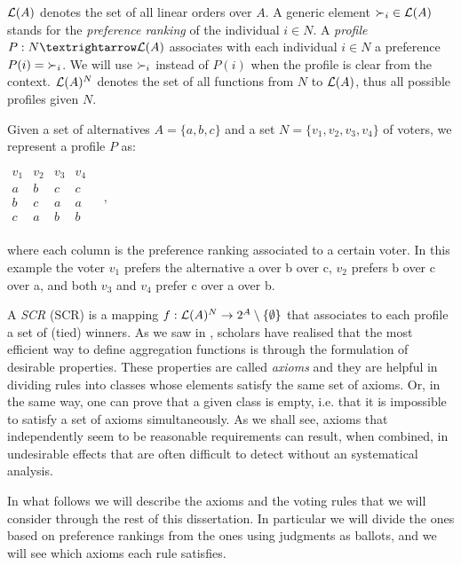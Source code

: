 $\mathcal{L}(A)$ denotes the set of all linear orders over $A$. A generic element $\mathop{\prefi} \in \linors$ stands for the \textit{preference ranking} of the individual $i\in N$.
A \emph{profile} $\prof: N → \linors$ associates with each individual $i \in N$ a preference $\prof(i) =\mathop{\prefi}$. We will use $\mathop{\prefi}$ instead of $P(i)$ when the profile is clear from the context. $\mathcal{L}(A)^{N}$ denotes the set of all functions from $N$ to $\mathcal{L}(A)$, thus all possible profiles given $N$. 
\begin{example}
	\label{ex:namedprofile}
	Given a set of alternatives $A=\{a,b,c\}$ and a set $N=\{v_1,v_2,v_3,v_4\}$ of voters, we represent a profile $P$ as:
	\begin{center}
		$
		\begin{array}{cccc}
			v_1 & v_2 & v_3 & v_4\\
			a &	b & c & c \\
			b &	c & a & a \\
			c &	a & b & b \\
		\end{array} \quad, 
		$
	\end{center}
	where each column is the preference ranking associated to a certain voter. In this example the voter $v_1$ prefers the alternative a over b over c, $v_2$ prefers b over c over a, and both $v_3$ and $v_4$ prefer c over a over b.
\end{example}

A \emph{\acl{SCR}} (\acs{SCR}) is a mapping $f:\mathcal{L}(A)^{N}\rightarrow 2^{A} \setminus \{\emptyset \}$ that associates to each profile a set of (tied) winners. 
As we saw in , scholars have realised that the most efficient way to define aggregation functions is through the formulation of desirable properties.
These properties are called \textit{axioms} and they are helpful in dividing rules into classes whose elements satisfy the same set of axioms.
Or, in the same way, one can prove that a given class is empty, i.e. that it is impossible to satisfy a set of axioms simultaneously.
As we shall see, axioms that independently seem to be reasonable requirements can result, when combined, in undesirable effects that are often difficult to detect without an systematical analysis.

In what follows we will describe the axioms and the voting rules that we will consider through the rest of this dissertation. In particular we will divide the ones based on preference rankings from the ones using judgments as ballots, and we will see which axioms each rule satisfies.


